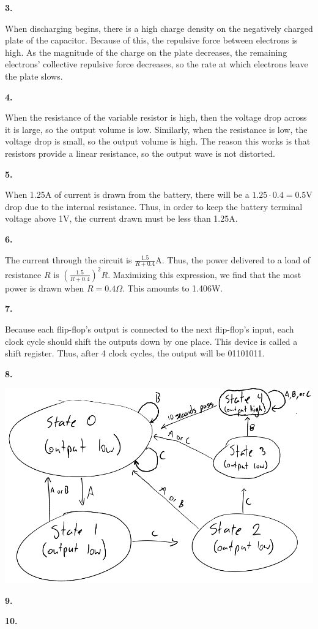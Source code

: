 \documentclass{article}
\begin{document}
\newpage\noindent\textbf{3.}

    When discharging begins, there is a high charge density on the negatively charged plate of the capacitor.
    Because of this, the repulsive force between electrons is high.
    As the magnitude of the charge on the plate decreases, the remaining electrons' collective repulsive force decreases, so the rate at which electrons leave the plate slows.

\newpage\noindent\textbf{4.}

    When the resistance of the variable resistor is high, then the voltage drop across it is large, so the output volume is low.
    Similarly, when the resistance is low, the voltage drop is small, so the output volume is high.
    The reason this works is that resistors provide a linear resistance, so the output wave is not distorted.

\newpage\noindent\textbf{5.}

    When 1.25A of current is drawn from the battery, there will be a $1.25 \cdot 0.4 = 0.5$V drop due to the internal resistance. Thus, in order to keep the battery terminal voltage above 1V, the current drawn must be less than 1.25A.

\newpage\noindent\textbf{6.}

    The current through the circuit is $\frac{1.5}{R + 0.4}$A.
    Thus, the power delivered to a load of resistance $R$ is $\left(\frac{1.5}{R+0.4}\right)^2R$.
    Maximizing this expression, we find that the most power is drawn when $R=0.4\Omega$.
    This amounts to 1.406W.

\newpage\noindent\textbf{7.}

    Because each flip-flop's output is connected to the next flip-flop's input, each clock cycle should shift the outputs down by one place.
    This device is called a shift register.
    Thus, after 4 clock cycles, the output will be 01101011.
    
\newpage\noindent\textbf{8.}
\begin{center}
    \includegraphics[scale=.6]{3.png}
\end{center}

\newpage\noindent\textbf{9.}

\newpage\noindent\textbf{10.}
\end{document}
